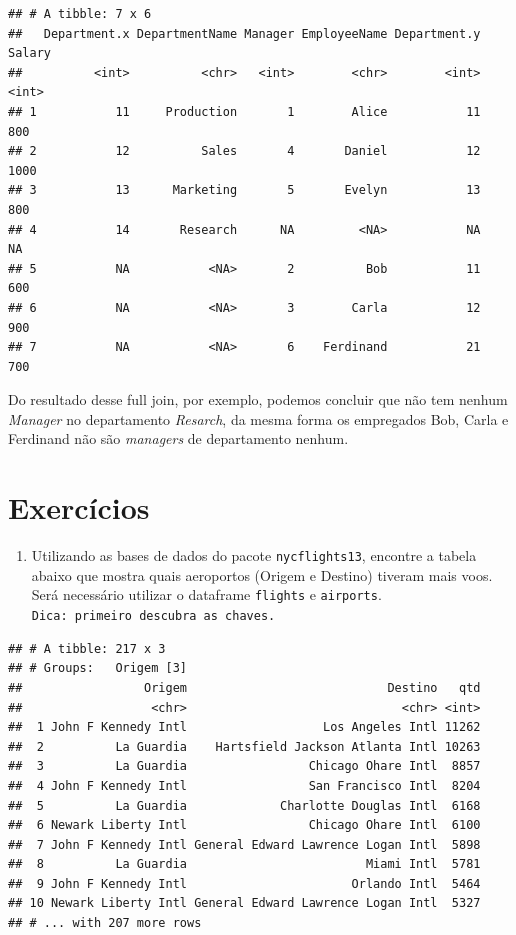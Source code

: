 \documentclass[]{book}
\providecommand{\tightlist}{%
  \setlength{\itemsep}{0pt}\setlength{\parskip}{0pt}}
\begin{document}
\begin{verbatim}
## # A tibble: 7 x 6
##   Department.x DepartmentName Manager EmployeeName Department.y Salary
##          <int>          <chr>   <int>        <chr>        <int>  <int>
## 1           11     Production       1        Alice           11    800
## 2           12          Sales       4       Daniel           12   1000
## 3           13      Marketing       5       Evelyn           13    800
## 4           14       Research      NA         <NA>           NA     NA
## 5           NA           <NA>       2          Bob           11    600
## 6           NA           <NA>       3        Carla           12    900
## 7           NA           <NA>       6    Ferdinand           21    700
\end{verbatim}

Do resultado desse full join, por exemplo, podemos concluir que não tem
nenhum \emph{Manager} no departamento \emph{Resarch}, da mesma forma os
empregados Bob, Carla e Ferdinand não são \emph{managers} de
departamento nenhum.

\section{Exercícios}\label{exercicios-5}

\begin{enumerate}
\def\labelenumi{\arabic{enumi}.}
\tightlist
\item
  Utilizando as bases de dados do pacote \texttt{nycflights13}, encontre
  a tabela abaixo que mostra quais aeroportos (Origem e Destino) tiveram
  mais voos. Será necessário utilizar o dataframe \texttt{flights} e
  \texttt{airports}. \texttt{Dica:\ primeiro\ descubra\ as\ chaves.}
\end{enumerate}

\begin{verbatim}
## # A tibble: 217 x 3
## # Groups:   Origem [3]
##                 Origem                            Destino   qtd
##                  <chr>                              <chr> <int>
##  1 John F Kennedy Intl                   Los Angeles Intl 11262
##  2          La Guardia    Hartsfield Jackson Atlanta Intl 10263
##  3          La Guardia                 Chicago Ohare Intl  8857
##  4 John F Kennedy Intl                 San Francisco Intl  8204
##  5          La Guardia             Charlotte Douglas Intl  6168
##  6 Newark Liberty Intl                 Chicago Ohare Intl  6100
##  7 John F Kennedy Intl General Edward Lawrence Logan Intl  5898
##  8          La Guardia                         Miami Intl  5781
##  9 John F Kennedy Intl                       Orlando Intl  5464
## 10 Newark Liberty Intl General Edward Lawrence Logan Intl  5327
## # ... with 207 more rows
\end{verbatim}
\end{document}
